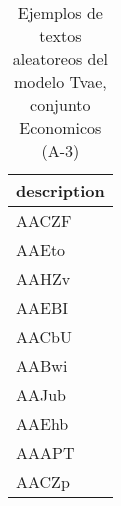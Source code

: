 \begin{table}[H]
\centering
\fontsize{8}{14}\selectfont
\caption{Ejemplos de textos aleatoreos del modelo Tvae, conjunto Economicos (A-3)}
\label{table-sample10-economicos-a-3-tvae-text}
\begin{tabular}{|m{50em}|}
\hline
\rowcolor[gray]{0.8}
description \\
\hline AACZF \\
\hline AAEto \\
\hline AAHZv \\
\hline AAEBI \\
\hline AACbU \\
\hline AABwi \\
\hline AAJub \\
\hline AAEhb \\
\hline AAAPT \\
\hline AACZp \\
\hline
\end{tabular}
\end{table}
